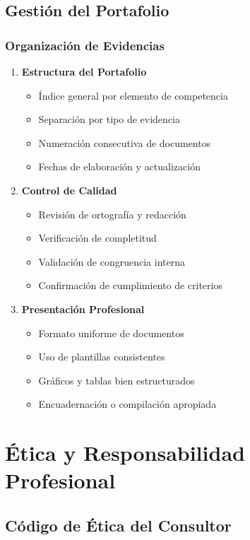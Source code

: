 \documentclass[12pt,letterpaper,oneside]{book}
\begin{document}
\subsection{Gestión del Portafolio}

\subsubsection{Organización de Evidencias}

\begin{enumerate}
\item \textbf{Estructura del Portafolio}
   \begin{itemize}
   \item Índice general por elemento de competencia
   \item Separación por tipo de evidencia
   \item Numeración consecutiva de documentos
   \item Fechas de elaboración y actualización
   \end{itemize}

\item \textbf{Control de Calidad}
   \begin{itemize}
   \item Revisión de ortografía y redacción
   \item Verificación de completitud
   \item Validación de congruencia interna
   \item Confirmación de cumplimiento de criterios
   \end{itemize}

\item \textbf{Presentación Profesional}
   \begin{itemize}
   \item Formato uniforme de documentos
   \item Uso de plantillas consistentes
   \item Gráficos y tablas bien estructurados
   \item Encuadernación o compilación apropiada
   \end{itemize}
\end{enumerate}

\section{Ética y Responsabilidad Profesional}

\subsection{Código de Ética del Consultor}
\end{document}
